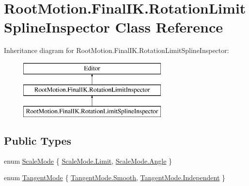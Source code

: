 \hypertarget{class_root_motion_1_1_final_i_k_1_1_rotation_limit_spline_inspector}{}\section{Root\+Motion.\+Final\+I\+K.\+Rotation\+Limit\+Spline\+Inspector Class Reference}
\label{class_root_motion_1_1_final_i_k_1_1_rotation_limit_spline_inspector}
Inheritance diagram for Root\+Motion.\+Final\+I\+K.\+Rotation\+Limit\+Spline\+Inspector\+:\begin{figure}[H]
\begin{center}
\leavevmode
\includegraphics[height=3.000000cm]{class_root_motion_1_1_final_i_k_1_1_rotation_limit_spline_inspector}
\end{center}
\end{figure}
\subsection*{Public Types}
\begin{DoxyCompactItemize}
\item 
enum \mbox{\hyperlink{class_root_motion_1_1_final_i_k_1_1_rotation_limit_spline_inspector_a6c3cce5f48375afcc33c2949d65288f3}{Scale\+Mode}} \{ \mbox{\hyperlink{class_root_motion_1_1_final_i_k_1_1_rotation_limit_spline_inspector_a6c3cce5f48375afcc33c2949d65288f3a80d2677cf518f4d04320042f4ea6c146}{Scale\+Mode.\+Limit}}, 
\mbox{\hyperlink{class_root_motion_1_1_final_i_k_1_1_rotation_limit_spline_inspector_a6c3cce5f48375afcc33c2949d65288f3a45f4ce6c3306644b1efe333f4f8d6929}{Scale\+Mode.\+Angle}}
 \}
\item 
enum \mbox{\hyperlink{class_root_motion_1_1_final_i_k_1_1_rotation_limit_spline_inspector_a323e8a268dfa81d71e31ee600d763034}{Tangent\+Mode}} \{ \mbox{\hyperlink{class_root_motion_1_1_final_i_k_1_1_rotation_limit_spline_inspector_a323e8a268dfa81d71e31ee600d763034ae510cdf33cd497134b47b9316314d4b4}{Tangent\+Mode.\+Smooth}}, 
\mbox{\hyperlink{class_root_motion_1_1_final_i_k_1_1_rotation_limit_spline_inspector_a323e8a268dfa81d71e31ee600d763034ae9e003c325eec6946ed1d23c6ac90a21}{Tangent\+Mode.\+Independent}}
 \}
\end{DoxyCompactItemize}
